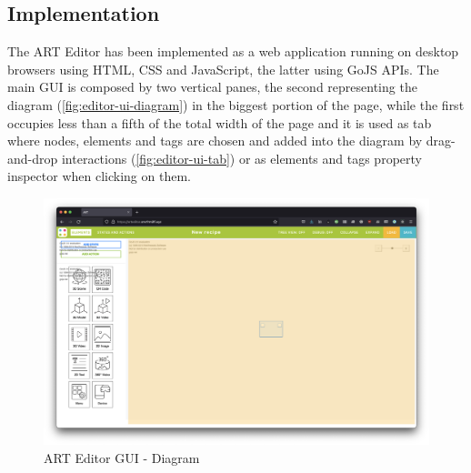 \subsection{Implementation}
\label{subsec:art-editor-implementation}
The ART Editor has been implemented as a web application running on desktop browsers using HTML, CSS and JavaScript, the latter using GoJS \glspl{API}. The main \gls{GUI} is composed by two vertical panes, the second representing the diagram (\autoref{fig:editor-ui-diagram}) in the biggest portion of the page, while the first occupies less than a fifth of the total width of the page and it is used as tab where nodes, elements and tags are chosen and added into the diagram by drag-and-drop interactions (\autoref{fig:editor-ui-tab}) or as elements and tags property inspector when clicking on them.
\begin{figure}[h]
    \centering
    \includegraphics[width=\textwidth]{Figures/Editor/editor-ui-diagram.png}
    \caption{ART Editor GUI - Diagram}
    \label{fig:editor-ui-diagram}
\end{figure}

